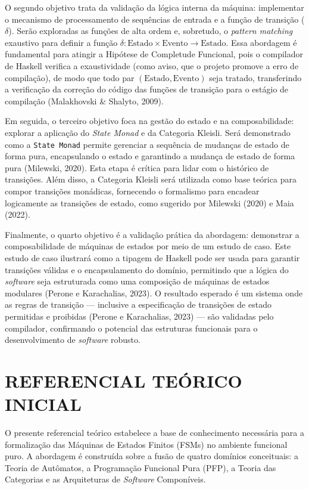 \documentclass[12pt,a4paper]{article}
\begin{document}
O segundo objetivo trata da validação da lógica interna da máquina: implementar o mecanismo de processamento de sequências de entrada e a função de transição ($\delta$). Serão exploradas as funções de alta ordem e, sobretudo, o \textit{pattern matching} exaustivo para definir a função $\delta: \text{Estado} \times \text{Evento} \to \text{Estado}$. Essa abordagem é fundamental para atingir a Hipótese de Completude Funcional, pois o compilador de Haskell verifica a exaustividade (como aviso, que o projeto promove a erro de compilação), de modo que todo par $(\text{Estado}, \text{Evento})$ seja tratado, transferindo a verificação da correção do código das funções de transição para o estágio de compilação (Malakhovski \& Shalyto, 2009).

Em seguida, o terceiro objetivo foca na gestão do estado e na composabilidade: explorar a aplicação do \textit{State Monad} e da Categoria Kleisli. Será demonstrado como a \texttt{State Monad} permite gerenciar a sequência de mudanças de estado de forma pura, encapsulando o estado e garantindo a mudança de estado de forma pura (Milewski, 2020). Esta etapa é crítica para lidar com o histórico de transições. Além disso, a Categoria Kleisli será utilizada como base teórica para compor transições monádicas, fornecendo o formalismo para encadear logicamente as transições de estado, como sugerido por Milewski (2020) e Maia (2022).

Finalmente, o quarto objetivo é a validação prática da abordagem: demonstrar a composabilidade de máquinas de estados por meio de um estudo de caso. Este estudo de caso ilustrará como a tipagem de Haskell pode ser usada para garantir transições válidas e o encapsulamento do domínio, permitindo que a lógica do \textit{software} seja estruturada como uma composição de máquinas de estados modulares (Perone e Karachalias, 2023). O resultado esperado é um sistema onde as regras de transição --- inclusive a especificação de transições de estado permitidas e proibidas (Perone e Karachalias, 2023) --- são validadas pelo compilador, confirmando o potencial das estruturas funcionais para o desenvolvimento de \textit{software} robusto.

\section{REFERENCIAL TEÓRICO INICIAL}
O presente referencial teórico estabelece a base de conhecimento necessária para a formalização das Máquinas de Estados Finitos (FSMs) no ambiente funcional puro. A abordagem é construída sobre a fusão de quatro domínios conceituais: a Teoria de Autômatos, a Programação Funcional Pura (PFP), a Teoria das Categorias e as Arquiteturas de \textit{Software} Componíveis.
\end{document}
